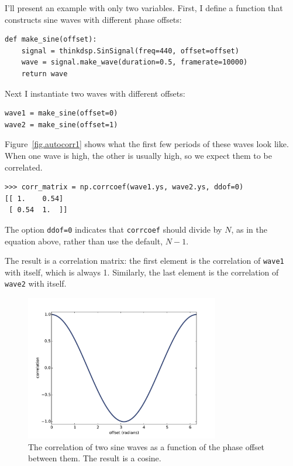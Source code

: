 \documentclass[12pt]{book}
\begin{document}
I'll present an example with only two variables.  First, I define
a function that constructs sine waves with different phase offsets:

\begin{verbatim}
def make_sine(offset):
    signal = thinkdsp.SinSignal(freq=440, offset=offset)
    wave = signal.make_wave(duration=0.5, framerate=10000)
    return wave
\end{verbatim}

Next I instantiate two waves with different offsets:

\begin{verbatim}
wave1 = make_sine(offset=0)
wave2 = make_sine(offset=1)
\end{verbatim}

Figure~\ref{fig.autocorr1} shows what the first few periods of these
waves look like.  When one wave is high, the other is usually high, so we
expect them to be correlated.

\begin{verbatim}
>>> corr_matrix = np.corrcoef(wave1.ys, wave2.ys, ddof=0)
[[ 1.    0.54]
 [ 0.54  1.  ]]
\end{verbatim}

The option {\tt ddof=0} indicates that {\tt corrcoef} should divide by
$N$, as in the equation above, rather than use the default, $N-1$.

The result is a correlation matrix:
the first element is the correlation of {\tt wave1}
with itself, which is always 1.  Similarly, the last element
is the correlation of {\tt wave2} with itself.

\begin{figure}
\centerline{\includegraphics[height=2.5in]{figs/autocorr2.pdf}}
\caption{The correlation of two sine waves as a function of the
phase offset between them.  The result is a cosine.}
\label{fig.autocorr2}
\end{figure}
\end{document}
